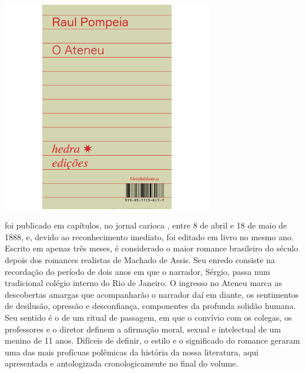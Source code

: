 \hspace{.5cm}

\begin{center}
\hspace*{.5cm}\includegraphics[width=92mm]{./grid/ateneu.jpg}
\end{center}

\hspace*{-7cm}\hrulefill\hspace*{-7cm}

\medskip

 foi publicado em capítulos,
no jornal carioca {}, entre 8 de abril e 18 de maio de 1888, e,
devido ao reconhecimento imediato, foi editado em livro no mesmo ano.
Escrito em apenas três meses, é considerado o maior romance brasileiro do
século  depois dos romances realistas de Machado de Assis. Seu
enredo consiste na recordação do período de dois anos em que o narrador,
Sérgio, passa num tradicional colégio interno do Rio de Janeiro. O
ingresso no Ateneu marca as descobertas amargas que acompanharão o
narrador daí em diante, os sentimentos de desilusão, opressão e
desconfiança, componentes da profunda solidão humana. Seu sentido é o
de um ritual de passagem, em que o convívio com os colegas, os
professores e o diretor definem a afirmação moral, sexual e intelectual
de um menino de 11 anos. Difíceis de definir, o estilo e o
significado do romance geraram uma das mais profícuas polêmicas da
história da nossa literatura, aqui apresentada e antologizada
cronologicamente no final do volume.


\vfill
\enlargethispage{\baselineskip}



